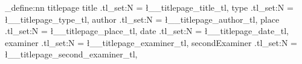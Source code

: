 \def\hlmint{\fontfamily{lmss}\fontsize{19pt}{19pt}\fontseries{b}\color{fh-mint}\selectfont}
\def\hlAbold{\fontfamily{lmss}\fontsize{14pt}{30pt}\fontseries{b}\selectfont}
\def\hlAnormal{\fontfamily{lmss}\fontsize{14pt}{14pt}\fontseries{n}\selectfont}

\newcommand{\showlogo}{


    \begin{picture}(0pt,0pt)(2cm,-2cm)
        \put(18cm,-3cm){\texttt{[image: fh-logo-right]}}
    \end{picture}
}

\ExplSyntaxOn
\keys_define:nn { titlepage }
{
    title  .tl_set:N  = \l__titlepage_title_tl,
    type .tl_set:N  = \l__titlepage_type_tl,
    author  .tl_set:N  = \l__titlepage_author_tl,
    place  .tl_set:N  = \l__titlepage_place_tl,
    date .tl_set:N  = \l__titlepage_date_tl,
    examiner .tl_set:N  = \l__titlepage_examiner_tl,
    secondExaminer .tl_set:N  = \l__titlepage_second_examiner_tl,
}

